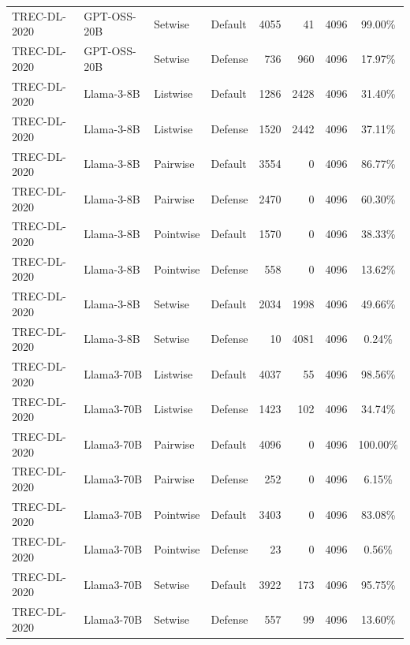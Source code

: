 \begin{table}[t]
\begin{tabular}{ll l l r r r c}
TREC-DL-2020 & GPT-OSS-20B & Setwise & Default & 4055 & 41 & 4096 & 99.00\% \\
TREC-DL-2020 & GPT-OSS-20B & Setwise & Defense & 736 & 960 & 4096 & 17.97\% \\
TREC-DL-2020 & Llama-3-8B & Listwise & Default & 1286 & 2428 & 4096 & 31.40\% \\
TREC-DL-2020 & Llama-3-8B & Listwise & Defense & 1520 & 2442 & 4096 & 37.11\% \\
TREC-DL-2020 & Llama-3-8B & Pairwise & Default & 3554 & 0 & 4096 & 86.77\% \\
TREC-DL-2020 & Llama-3-8B & Pairwise & Defense & 2470 & 0 & 4096 & 60.30\% \\
TREC-DL-2020 & Llama-3-8B & Pointwise & Default & 1570 & 0 & 4096 & 38.33\% \\
TREC-DL-2020 & Llama-3-8B & Pointwise & Defense & 558 & 0 & 4096 & 13.62\% \\
TREC-DL-2020 & Llama-3-8B & Setwise & Default & 2034 & 1998 & 4096 & 49.66\% \\
TREC-DL-2020 & Llama-3-8B & Setwise & Defense & 10 & 4081 & 4096 & 0.24\% \\
TREC-DL-2020 & Llama3-70B & Listwise & Default & 4037 & 55 & 4096 & 98.56\% \\
TREC-DL-2020 & Llama3-70B & Listwise & Defense & 1423 & 102 & 4096 & 34.74\% \\
TREC-DL-2020 & Llama3-70B & Pairwise & Default & 4096 & 0 & 4096 & 100.00\% \\
TREC-DL-2020 & Llama3-70B & Pairwise & Defense & 252 & 0 & 4096 & 6.15\% \\
TREC-DL-2020 & Llama3-70B & Pointwise & Default & 3403 & 0 & 4096 & 83.08\% \\
TREC-DL-2020 & Llama3-70B & Pointwise & Defense & 23 & 0 & 4096 & 0.56\% \\
TREC-DL-2020 & Llama3-70B & Setwise & Default & 3922 & 173 & 4096 & 95.75\% \\
TREC-DL-2020 & Llama3-70B & Setwise & Defense & 557 & 99 & 4096 & 13.60\% \\
\bottomrule
\end{tabular}
\end{table}

